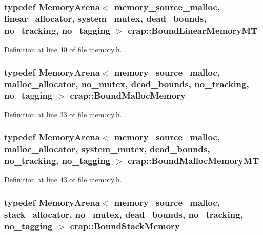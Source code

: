 \subsubsection[{Bound\+Linear\+Memory\+M\+T}]{\setlength{\rightskip}{0pt plus 5cm}typedef {\bf Memory\+Arena}$<$ {\bf memory\+\_\+source\+\_\+malloc}, {\bf linear\+\_\+allocator}, {\bf system\+\_\+mutex}, {\bf dead\+\_\+bounds}, {\bf no\+\_\+tracking}, {\bf no\+\_\+tagging} $>$ {\bf crap\+::\+Bound\+Linear\+Memory\+M\+T}}\label{namespacecrap_a55259fc8a1932b947a5b796be2f346dc}


Definition at line 40 of file memory.\+h.

\hypertarget{namespacecrap_a8d06ec26605b8fbab3675d68bc669a2b}{}
\subsubsection[{Bound\+Malloc\+Memory}]{\setlength{\rightskip}{0pt plus 5cm}typedef {\bf Memory\+Arena}$<$ {\bf memory\+\_\+source\+\_\+malloc}, {\bf malloc\+\_\+allocator}, {\bf no\+\_\+mutex}, {\bf dead\+\_\+bounds}, {\bf no\+\_\+tracking}, {\bf no\+\_\+tagging} $>$ {\bf crap\+::\+Bound\+Malloc\+Memory}}\label{namespacecrap_a8d06ec26605b8fbab3675d68bc669a2b}


Definition at line 33 of file memory.\+h.

\hypertarget{namespacecrap_a0e1ad1a243444e07c558d2553b3949da}{}
\subsubsection[{Bound\+Malloc\+Memory\+M\+T}]{\setlength{\rightskip}{0pt plus 5cm}typedef {\bf Memory\+Arena}$<$ {\bf memory\+\_\+source\+\_\+malloc}, {\bf malloc\+\_\+allocator}, {\bf system\+\_\+mutex}, {\bf dead\+\_\+bounds}, {\bf no\+\_\+tracking}, {\bf no\+\_\+tagging} $>$ {\bf crap\+::\+Bound\+Malloc\+Memory\+M\+T}}\label{namespacecrap_a0e1ad1a243444e07c558d2553b3949da}


Definition at line 43 of file memory.\+h.

\hypertarget{namespacecrap_af1fa4a94e1cfd326b0c488a328e154a3}{}
\subsubsection[{Bound\+Stack\+Memory}]{\setlength{\rightskip}{0pt plus 5cm}typedef {\bf Memory\+Arena}$<$ {\bf memory\+\_\+source\+\_\+malloc}, {\bf stack\+\_\+allocator}, {\bf no\+\_\+mutex}, {\bf dead\+\_\+bounds}, {\bf no\+\_\+tracking}, {\bf no\+\_\+tagging} $>$ {\bf crap\+::\+Bound\+Stack\+Memory}}\label{namespacecrap_af1fa4a94e1cfd326b0c488a328e154a3}


